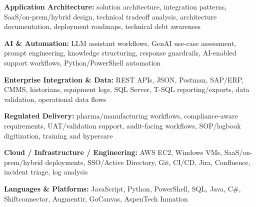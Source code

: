 \begin{skillsBullets}
  \item \textbf{Application Architecture:} solution architecture, integration patterns, SaaS/on-prem/hybrid design, technical tradeoff analysis, architecture documentation, deployment roadmaps, technical debt awareness
  \item \textbf{AI \& Automation:} LLM assistant workflows, GenAI use-case assessment, prompt engineering, knowledge structuring, response guardrails, AI-enabled support workflows, Python/PowerShell automation
  \item \textbf{Enterprise Integration \& Data:} REST APIs, JSON, Postman, SAP/ERP, CMMS, historians, equipment logs, SQL Server, T-SQL reporting/exports, data validation, operational data flows
  \item \textbf{Regulated Delivery:} pharma/manufacturing workflows, compliance-aware requirements, UAT/validation support, audit-facing workflows, SOP/logbook digitization, training and hypercare
  \item \textbf{Cloud / Infrastructure / Engineering:} AWS EC2, Windows VMs, SaaS/on-prem/hybrid deployments, SSO/Active Directory, Git, CI/CD, Jira, Confluence, incident triage, log analysis
  \item \textbf{Languages \& Platforms:} JavaScript, Python, PowerShell, SQL, Java, C\#, Shiftconnector, Augmentir, GoCanvas, AspenTech Inmation
\end{skillsBullets}
